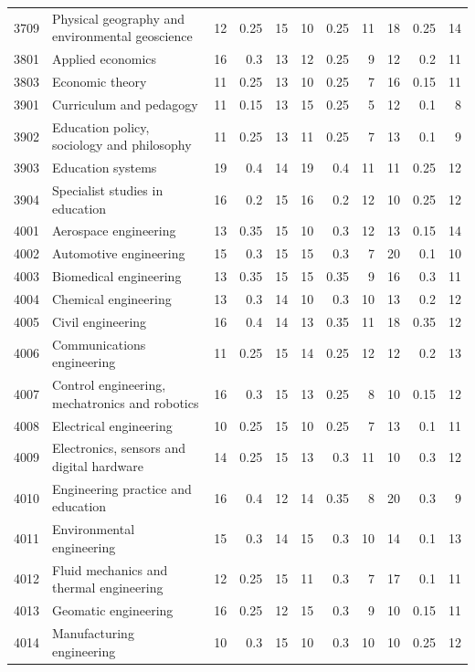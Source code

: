 \begin{longtable}{r p{2.15cm} rrr rrr rrr}
3709 & Physical geography and environmental geoscience & 12 & 0.25 & 15 & 10 & 0.25 & 11 & 18 & 0.25 & 14 \\
3801 & Applied economics & 16 & 0.3 & 13 & 12 & 0.25 & 9 & 12 & 0.2 & 11 \\
3803 & Economic theory & 11 & 0.25 & 13 & 10 & 0.25 & 7 & 16 & 0.15 & 11 \\
3901 & Curriculum and pedagogy & 11 & 0.15 & 13 & 15 & 0.25 & 5 & 12 & 0.1 & 8 \\
3902 & Education policy, sociology and philosophy & 11 & 0.25 & 13 & 11 & 0.25 & 7 & 13 & 0.1 & 9 \\
3903 & Education systems & 19 & 0.4 & 14 & 19 & 0.4 & 11 & 11 & 0.25 & 12 \\
3904 & Specialist studies in education & 16 & 0.2 & 15 & 16 & 0.2 & 12 & 10 & 0.25 & 12 \\
4001 & Aerospace engineering & 13 & 0.35 & 15 & 10 & 0.3 & 12 & 13 & 0.15 & 14 \\
4002 & Automotive engineering & 15 & 0.3 & 15 & 15 & 0.3 & 7 & 20 & 0.1 & 10 \\
4003 & Biomedical engineering & 13 & 0.35 & 15 & 15 & 0.35 & 9 & 16 & 0.3 & 11 \\
4004 & Chemical engineering & 13 & 0.3 & 14 & 10 & 0.3 & 10 & 13 & 0.2 & 12 \\
4005 & Civil engineering & 16 & 0.4 & 14 & 13 & 0.35 & 11 & 18 & 0.35 & 12 \\
4006 & Communications engineering & 11 & 0.25 & 15 & 14 & 0.25 & 12 & 12 & 0.2 & 13 \\
4007 & Control engineering, mechatronics and robotics & 16 & 0.3 & 15 & 13 & 0.25 & 8 & 10 & 0.15 & 12 \\
4008 & Electrical engineering & 10 & 0.25 & 15 & 10 & 0.25 & 7 & 13 & 0.1 & 11 \\
4009 & Electronics, sensors and digital hardware & 14 & 0.25 & 15 & 13 & 0.3 & 11 & 10 & 0.3 & 12 \\
4010 & Engineering practice and education & 16 & 0.4 & 12 & 14 & 0.35 & 8 & 20 & 0.3 & 9 \\
4011 & Environmental engineering & 15 & 0.3 & 14 & 15 & 0.3 & 10 & 14 & 0.1 & 13 \\
4012 & Fluid mechanics and thermal engineering & 12 & 0.25 & 15 & 11 & 0.3 & 7 & 17 & 0.1 & 11 \\
4013 & Geomatic engineering & 16 & 0.25 & 12 & 15 & 0.3 & 9 & 10 & 0.15 & 11 \\
4014 & Manufacturing engineering & 10 & 0.3 & 15 & 10 & 0.3 & 10 & 10 & 0.25 & 12 \\

\end{longtable}
